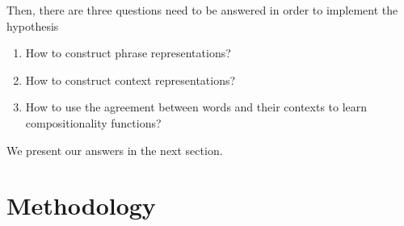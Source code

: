 \documentclass[11pt]{article}
\begin{document}
Then, there are three questions need to be answered in order to implement the 
hypothesis
\begin{enumerate}
	\item How to construct phrase representations?
	\item How to construct context representations?
	\item How to use the agreement between words and 
	their contexts to learn compositionality functions?
\end{enumerate}
We present our answers in the next section.


\section{Methodology}
\label{section methodology}
\end{document}
